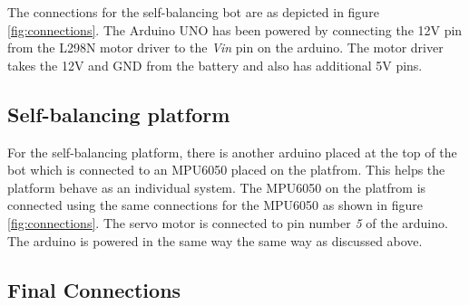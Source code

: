 The connections for the self-balancing bot are as depicted in figure \ref{fig:connections}. The Arduino UNO has been powered by connecting the 12V pin from the L298N motor driver to the \textit{Vin} pin on the arduino. The motor driver takes the 12V and GND from the battery and also has additional 5V pins.

\subsection{Self-balancing platform}

For the self-balancing platform, there is another arduino placed at the top of the bot which is connected to an MPU6050 placed on the platfrom. This helps the platform behave as an individual system. The MPU6050 on the platfrom is connected using the same connections for the MPU6050 as shown in figure \ref{fig:connections}. The servo motor is connected to pin number \textit{5} of the arduino. The arduino is powered in the same way the same way as discussed above.

\clearpage

\subsection{Final Connections}

